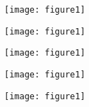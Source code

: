 \documentclass{article}
\begin{document}
	
	\texttt{[image: figure1]} %
	
	\texttt{[image: figure1]} %
	
	\texttt{[image: figure1]} %
	
	\texttt{[image: figure1]} %
	
	\texttt{[image: figure1]} %
	
\end{document}
